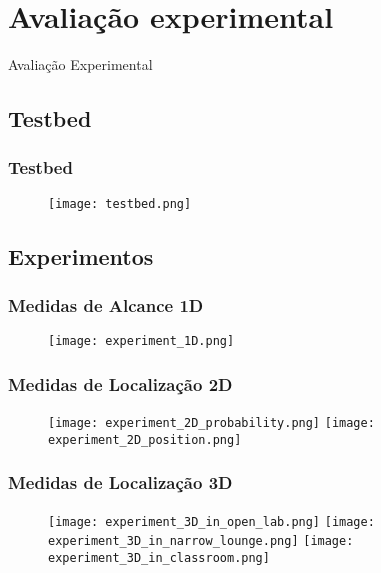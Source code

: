 \section{Avaliação experimental}

\begin{frame}
  \begin{center}
    \Huge Avaliação Experimental
        \end{center}
\end{frame}

\subsection{Testbed}

\begin{frame}
  \frametitle{Testbed}

  \begin{figure}
          \texttt{[image: testbed.png]}
  \end{figure}
\end{frame}

\subsection{Experimentos}

\begin{frame}
  \frametitle{Medidas de Alcance 1D}

  \begin{figure}
          \texttt{[image: experiment\_1D.png]}
  \end{figure}
\end{frame}

\begin{frame}
  \frametitle{Medidas de Localização 2D}

  \begin{figure}
          \texttt{[image: experiment\_2D\_probability.png]}
          \texttt{[image: experiment\_2D\_position.png]}
  \end{figure}
\end{frame}

\begin{frame}
  \frametitle{Medidas de Localização 3D}

  \begin{figure}
    \texttt{[image: experiment\_3D\_in\_open\_lab.png]}\hfil
    \texttt{[image: experiment\_3D\_in\_narrow\_lounge.png]}\newline
    \hfil\hfil\texttt{[image: experiment\_3D\_in\_classroom.png]}
        \end{figure}
\end{frame}

